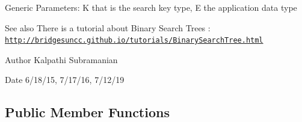 Generic Parameters\+: K that is the search key type, E the application data type

\begin{DoxySeeAlso}{See also}
There is a tutorial about Binary Search Trees \+: \href{http://bridgesuncc.github.io/tutorials/BinarySearchTree.html}{\tt http\+://bridgesuncc.\+github.\+io/tutorials/\+Binary\+Search\+Tree.\+html}
\end{DoxySeeAlso}
\begin{DoxyAuthor}{Author}
Kalpathi Subramanian 
\end{DoxyAuthor}
\begin{DoxyDate}{Date}
6/18/15, 7/17/16, 7/12/19 
\end{DoxyDate}
\subsection*{Public Member Functions}
